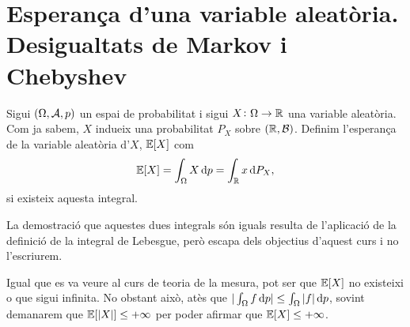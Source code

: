 
\section{Esperança d'una variable aleatòria. Desigualtats de Markov i Chebyshev}

\begin{defi}
    Sigui $(\Omega,\mathcal{A},p)$ un espai de probabilitat i sigui $X\colon\Omega\to\mathbb{R}$ una variable aleatòria. Com ja sabem, $X$ indueix una probabilitat $P_X$ sobre $\left(\mathbb{R},\mathcal{B}\right)$. Definim l'esperança de la variable aleatòria d'$X$, $\operatorname{\mathbb{E}}[X]$ com
    \[
        \esp[X] = \int_{\Omega}{X \dif p} = \int_{\real}{x \dif P_X},
    \]
    si existeix aquesta integral.
\end{defi}

\begin{obs}
    La demostració que aquestes dues integrals són iguals resulta de l'aplicació de la definició de la integral de Lebesgue, però escapa dels objectius d'aquest curs i no l'escriurem.
\end{obs}

\begin{obs}
    Igual que es va veure al curs de teoria de la mesura, pot ser que $\operatorname{\mathbb{E}}[X]$ no existeixi o que sigui infinita.
    No obstant això, atès que $|\int_{\Omega}{f\dif p}| \le \int_{\Omega}{|f|\dif p}$, sovint demanarem que
    $\operatorname{\mathbb{E}}[|X|] \le +\infty$ per poder afirmar que $\operatorname{\mathbb{E}}[X] \le +\infty$.
\end{obs}

\iffalse %
\begin{example}
    $A\in\Asuc$, i considerem $X(\omega) = \mathbb{I}_A(\omega) = \begin{cases}
    0 & \omega \in \A \\ 1 & \omega \notin \A \end{cases}$. L'esperança, calculada de les dues maneres, és:
    \[\esp[\mathbb{I}_A] = \int_\Omega{\mathbb{I}_A \dif p} = 1\cdot p(A) + 0\cdot p(\comp{A}) = p(A) \]
    \[\esp[\mathbb{I}_A] = \int_\real{x\dif p_X} = 1\cdot p_{\mathbb{I}_A}(1) + 0\cdot p_{\mathbb{I}_A}(\real\setminus1) =
    p_{\mathbb{I}_A}(1) = p(\mathbb{I}_A = 1) = p(A)\]
    Cal tenir en compte que $p_X(B) = p(\omega\in\Omega, X(\omega)\in B)$, $p_{\mathbb{I}_A}(B) = p(\omega\in\Omega, \mathbb{I}_A(\omega)\in B)$.
\end{example}
\fi

